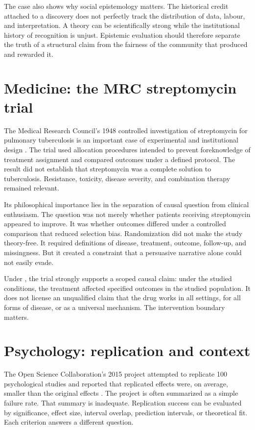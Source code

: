The case also shows why social epistemology matters. The historical credit
attached to a discovery does not perfectly track the distribution of data,
labour, and interpretation. A theory can be scientifically strong while the
institutional history of recognition is unjust. Epistemic evaluation should
therefore separate the truth of a structural claim from the fairness of the
community that produced and rewarded it.

\section{Medicine: the MRC streptomycin trial}

The Medical Research Council's 1948 controlled investigation of streptomycin
for pulmonary tuberculosis is an important case of experimental and
institutional design \citep{mrc1948}. The trial used allocation procedures
intended to prevent foreknowledge of treatment assignment and compared
outcomes under a defined protocol. The result did not establish that
streptomycin was a complete solution to tuberculosis. Resistance, toxicity,
disease severity, and combination therapy remained relevant.

Its philosophical importance lies in the separation of causal question from
clinical enthusiasm. The question was not merely whether patients receiving
streptomycin appeared to improve. It was whether outcomes differed under a
controlled comparison that reduced selection bias. Randomization did not make
the study theory-free. It required definitions of disease, treatment, outcome,
follow-up, and missingness. But it created a constraint that a persuasive
narrative alone could not easily evade.

Under \RCR, the trial strongly supports a scoped causal claim: under the
studied conditions, the treatment affected specified outcomes in the studied
population. It does not license an unqualified claim that the drug works in
all settings, for all forms of disease, or as a universal mechanism. The
intervention boundary matters.

\section{Psychology: replication and context}

The Open Science Collaboration's 2015 project attempted to replicate 100
psychological studies and reported that replicated effects were, on average,
smaller than the original effects \citep{osc2015}. The project is often
summarized as a simple failure rate. That summary is inadequate. Replication
success can be evaluated by significance, effect size, interval overlap,
prediction intervals, or theoretical fit. Each criterion answers a different
question.

